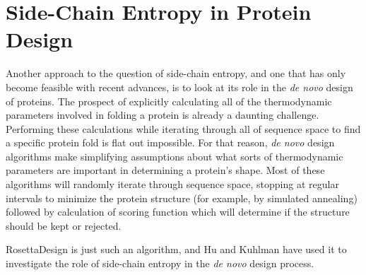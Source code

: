 \section*{Side-Chain Entropy in Protein Design}
\label{sec:side_chain_entropy_in_protein_design}
Another approach to the question of side-chain entropy, and one that has only become feasible with recent advances, is to look at its role in the \emph{de novo} design of proteins. The prospect of explicitly calculating all of the thermodynamic parameters involved in folding a protein is already a daunting challenge. Performing these calculations while iterating through all of sequence space to find a specific protein fold is flat out impossible. For that reason, \emph{de novo} design algorithms make simplifying assumptions about what sorts of thermodynamic parameters are important in determining a protein's shape. Most of these algorithms will randomly iterate through sequence space, stopping at regular intervals to minimize the protein structure (for example, by simulated annealing) followed by calculation of scoring function which will determine if the structure should be kept or rejected.

RosettaDesign is just such an algorithm, and Hu and Kuhlman have used it to investigate the role of side-chain entropy in the \emph{de novo} design process\cite{Hu:2006p68}.

